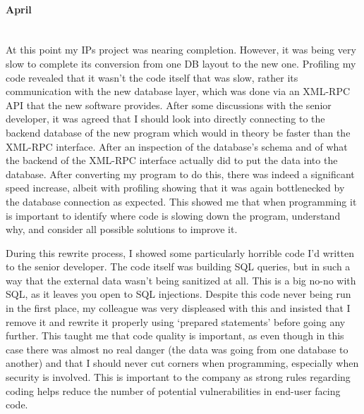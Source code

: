 \documentclass[12pt,a4paper]{article}
\newcommand{\paragraphnl}[1]{\paragraph{#1}\mbox{}\\}
\begin{document}
\paragraphnl{April}
	At this point my IPs project was nearing completion. However, it was being
	very slow to complete its conversion from one DB layout to the new one.
	Profiling my code revealed that it wasn't the code itself that was slow,
	rather its communication with the new database layer, which was done via an
	XML-RPC API that the new software provides. After some discussions with the
	senior developer, it was agreed that I should look into directly connecting
	to the backend database of the new program which would in theory be faster
	than the XML-RPC interface. After an inspection of the database's schema and
	of what the backend of the XML-RPC interface actually did to put the data
	into the database. After converting my program to do this, there was indeed
	a significant speed increase, albeit with profiling showing that it was
	again bottlenecked by the database connection as expected. This showed me
	that when programming it is important to identify where code is slowing down
	the program, understand why, and consider all possible solutions to improve
	it.

	During this rewrite process, I showed some particularly horrible code I'd
	written to the senior developer. The code itself was building SQL queries,
	but in such a way that the external data wasn't being sanitized at all. This
	is a big no-no with SQL, as it leaves you open to SQL injections. Despite
	this code never being run in the first place, my colleague was very
	displeased with this and insisted that I remove it and rewrite it properly
	using `prepared statements' before going any further. This taught me that
	code quality is important, as even though in this case there was almost no
	real danger (the data was going from one database to another) and that I
	should never cut corners when programming, especially when security is
	involved. This is important to the company as strong rules regarding coding
	helps reduce the number of potential vulnerabilities in end-user facing
	code.
\end{document}
